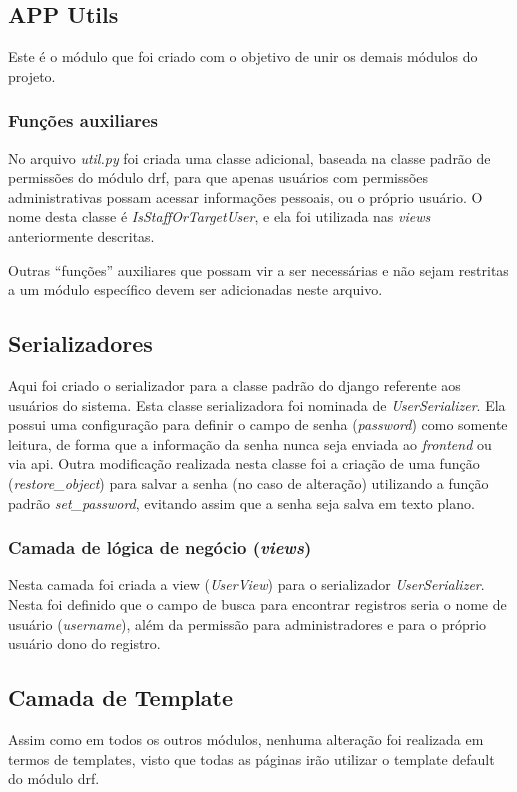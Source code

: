 \subsection{APP Utils}
Este é o módulo que foi criado com o objetivo de unir os demais módulos do projeto.

\subsubsection{Funções auxiliares}
No arquivo \textit{util.py} foi criada uma classe adicional, baseada na classe padrão de permissões do módulo \gls{drf}, para que apenas usuários com permissões administrativas possam acessar informações pessoais, ou o próprio usuário. O nome desta classe é \textit{IsStaffOrTargetUser}, e ela foi utilizada nas \textit{views} anteriormente descritas.

Outras ``funções'' auxiliares que possam vir a ser necessárias e não sejam restritas a um módulo específico devem ser adicionadas neste arquivo.

\subsection{Serializadores}
Aqui foi criado o serializador para a classe padrão do \gls{django} referente aos usuários do sistema. Esta classe serializadora foi nominada de \textit{UserSerializer}. Ela possui uma configuração para definir o campo de senha (\textit{password}) como somente leitura, de forma que a informação da senha nunca seja enviada ao \textit{frontend} ou via \gls{api}. Outra modificação realizada nesta classe foi a criação de uma função (\textit{restore\_object}) para salvar a senha (no caso de alteração) utilizando a função padrão \textit{set\_password}, evitando assim que a senha seja salva em texto plano.

\subsubsection{Camada de lógica de negócio (\textit{views})}
Nesta camada foi criada a view (\textit{UserView}) para o serializador \textit{UserSerializer}. Nesta foi definido que o campo de busca para encontrar registros seria o nome de usuário (\textit{username}), além da permissão para administradores e para o próprio usuário dono do registro.

\subsection{Camada de Template}
Assim como em todos os outros módulos, nenhuma alteração foi realizada em termos de templates, visto que todas as páginas irão utilizar o template default do módulo \gls{drf}.


